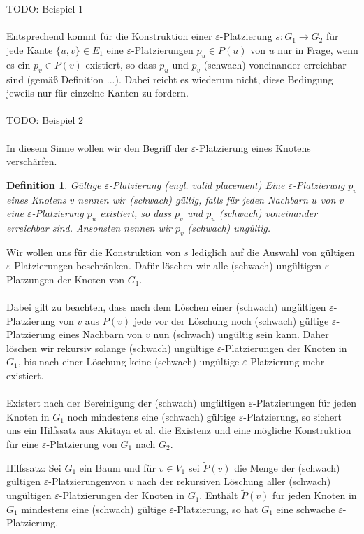 \documentclass[a4paper, 12pt, twoside]{article}
\theoremstyle{Format1} %
\newtheorem{Def}{Definition}[section]       %
\begin{document}
\\
\\
TODO: Beispiel 1
\\
\\
Entsprechend kommt für die Konstruktion einer $\varepsilon$-Platzierung $s: G_1 \to G_2$ für jede Kante $\{u,v\} \in E_1$ eine $\varepsilon$-Platzierungen $p_u \in P(u)$ von $u$ nur in Frage, wenn
es ein $p_v \in P(v)$ existiert, so dass $p_u$ und $p_v$ (schwach) voneinander erreichbar sind (gemäß Definition ...).
Dabei reicht es wiederum nicht, diese Bedingung jeweils nur für einzelne Kanten zu fordern.
\\
\\
TODO: Beispiel 2
\\
\\
In diesem Sinne wollen wir den Begriff der $\varepsilon$-Platzierung eines Knotens verschärfen.
\begin{Def}
	Gültige $\varepsilon$-Platzierung (engl. valid placement)
	Eine $\varepsilon$-Platzierung $p_v$ eines Knotens $v$ nennen wir (schwach) gültig, falls für jeden Nachbarn $u$ von $v$
	eine $\varepsilon$-Platzierung $p_u$ existiert, so dass $p_v$ und $p_u$ (schwach) voneinander erreichbar sind.
	Ansonsten nennen wir $p_v$ (schwach) ungültig.
\end{Def}

Wir wollen uns für die Konstruktion von $s$ lediglich auf die Auswahl von gültigen $\varepsilon$-Platzierungen beschränken.
Dafür löschen wir alle (schwach) ungültigen $\varepsilon$-Platzungen der Knoten von $G_1$.
\\
\\
Dabei gilt zu beachten, dass nach dem Löschen einer (schwach) ungültigen $\varepsilon$-Platzierung von $v$ aus $P(v)$
jede vor der Löschung noch (schwach) gültige $\varepsilon$-Platzierung eines Nachbarn von $v$ nun (schwach) ungültig sein kann.
Daher löschen wir rekursiv solange (schwach) ungültige $\varepsilon$-Platzierungen der Knoten in $G_1$, bis nach einer Löschung
keine (schwach) ungültige $\varepsilon$-Platzierung mehr existiert.
\\
\\
Existert nach der Bereinigung der (schwach) ungültigen $\varepsilon$-Platzierungen für jeden Knoten in $G_1$ noch mindestens eine
(schwach) gültige $\varepsilon$-Platzierung, so sichert uns ein Hilfssatz aus Akitaya et al. die Existenz und eine mögliche Konstruktion
für eine $\varepsilon$-Platzierung von $G_1$ nach $G_2$.

Hilfssatz:
Sei $G_1$ ein Baum und für $v \in V_1$ sei $\tilde{P}(v)$ die Menge der (schwach) gültigen $\varepsilon$-Platzierungenvon $v$ nach der
rekursiven Löschung aller (schwach) ungültigen $\varepsilon$-Platzierungen der Knoten in $G_1$. Enthält $\tilde{P}(v)$ für jeden Knoten
in $G_1$ mindestens eine (schwach) gültige $\varepsilon$-Platzierung, so hat $G_1$ eine schwache $\varepsilon$-Platzierung.
\end{document}
